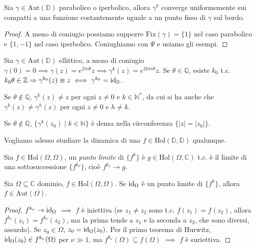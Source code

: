 \begin{cor}
  Sia $\gamma \in \text{Aut}(\mathbb{D})$ parabolico o iperbolico, allora $\gamma^k$ converge uniformemente sui compatti a una funzione costantemente uguale a un punto fisso di $\gamma$ sul bordo.
\end{cor}

\begin{proof}
  A meno di coniugio possiamo supporre $\text{Fix}(\gamma)=\{1\}$ nel caso parabolico e $\{1, -1\}$ nel caso iperbolico. Coniughiamo con $\Psi$ e usiamo gli esempi.
\end{proof}

Sia $\gamma \in \text{Aut}(\mathbb{D})$ ellittico, a meno di coniugio $\gamma(0)=0 \implies \gamma(z)=e^{2\pi i \theta}z \implies \gamma^k(z)=e^{2k\pi i \theta}z$.
Se $\theta \in \mathbb{Q}$, esiste $k_0$ t.c. $k_0\theta \in \mathbb{Z} \Rightarrow \gamma^{k_0}(z) \equiv z \iff \gamma^{k_0}=\operatorname{id}_{\mathbb{D}}$.

\begin{exc}
  Se $\theta \not\in \mathbb{Q}$, $\gamma^k(z) \not=z$ per ogni $z \not=0$ e $k \in \mathbb{N}^*$, da cui si ha anche che $\gamma^k(z)\not=\gamma^h(z)$ per ogni $z \not=0$ e $h \not=k$.
\end{exc}

\begin{exc}
  Se $\theta \not\in \mathbb{Q}$, $\{\gamma^k(z_0) \mid k \in \mathbb{N}\}$ è densa nella circonferenza $\{|z|=|z_0|\}$.
\end{exc}

Vogliamo adesso studiare la dinamica di una $f \in \text{Hol}(\mathbb{D}, \mathbb{D})$ qualunque.

\begin{defn}
  Sia $f \in \text{Hol}(\Omega, \Omega)$, un \textit{punto limite} di $\{f^k\}$ è $g \in \text{Hol}(\Omega, \mathbb{C})$ t.c. è il limite di una sottosuccessione $\{f^{k_{\nu}}\}$, cioè $f^{k_{\nu}} \rightarrow g$.
\end{defn}

\begin{lm} \label{pli}
  Sia $\Omega \subseteq \mathbb{C}$ dominio, $f \in \text{Hol}(\Omega, \Omega)$. Se $\operatorname{id}_{\Omega}$ è un punto limite di $\{f^k\}$, allora $f \in \text{Aut}(\Omega)$.
\end{lm}

\begin{proof}
  $f^{k_{\nu}} \rightarrow \operatorname{id}_{\Omega}$ $\implies$ $f$ è iniettiva (se $z_1 \not=z_2$ sono t.c. $f(z_1)=f(z_2)$, allora $f^{k_{\nu}}(z_1)=f^{k_{\nu}}(z_2)$, ma la prima tende a $z_1$ e la seconda a $z_2$, che sono diversi, assurdo).
  Se $z_0 \in \Omega$, $z_0=\operatorname{id}_{\Omega}(z_0)$. Per il primo teorema di Hurwitz, $\operatorname{id}_{\Omega}(z_0) \in f^{k_{\nu}}(\Omega)$ per $\nu \gg 1$, ma $f^{k_{\nu}}(\Omega) \subseteq f(\Omega)$ $\implies$ $f$ è suriettiva.
\end{proof}

